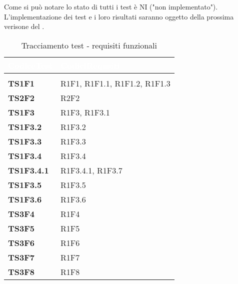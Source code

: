 Come si può notare lo stato di tutti i test è NI ("non implementato"). L'implementazione dei test e i loro risultati saranno oggetto della prossima verisone del \PdQv.

\renewcommand{\arraystretch}{1.5}
\renewcommand{\arraystretch}{1.5}
\renewcommand\extrarowheight{1.5pt}
\begin{longtable}{C{2.5cm} C{10cm} } 
		\textcolor{white}{\textbf{CodiceTest}} & 
		\textcolor{white}{\textbf{CodiciRequsiti}} \\
		\endfirsthead
		 \\
	    \endfoot
	    \caption{Tracciamento test - requisiti funzionali}
	    \endlastfoot
		\hline
		\textbf{TS1F1} & R1F1, R1F1.1, R1F1.2, R1F1.3 \\
		\textbf{TS2F2} & R2F2 \\
		\textbf{TS1F3} & R1F3, R1F3.1 \\
		\textbf{TS1F3.2} & R1F3.2 \\
		\textbf{TS1F3.3} & R1F3.3 \\
		\textbf{TS1F3.4} & R1F3.4 \\
		\textbf{TS1F3.4.1} & R1F3.4.1, R1F3.7 \\
		\textbf{TS1F3.5} & R1F3.5 \\
		\textbf{TS1F3.6} & R1F3.6 \\
		\textbf{TS3F4} & R1F4 \\
		\textbf{TS3F5} & R1F5 \\
		\textbf{TS3F6} & R1F6 \\
		\textbf{TS3F7} & R1F7 \\
		\textbf{TS3F8} & R1F8 \\
\end{longtable}